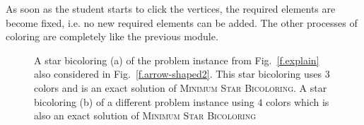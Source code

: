 \documentclass[11pt, twoside,a4paper]{book}
\newcommand{\MinStaBic}{\textsc{Minimum Star Bicoloring}}
\begin{document}
As soon as the student starts to click the vertices, the required elements
are become fixed, i.e. no new required elements can be added.
The other processes of coloring are completely like the previous module.


\begin{figure}
\centering
{}%
\hfill
{}%
\caption{A star bicoloring (a) of the problem instance from
Fig.~\protect\ref{f.explain} also considered in Fig.~\protect\ref{f.arrow-shaped2}. This
star bicoloring uses $3$ colors and is an exact solution of \MinStaBic. A star bicoloring
(b) of a different problem instance using $4$ colors which is also an exact
solution of \MinStaBic} \label{f.arrow-shaped4}
\end{figure}
\end{document}
